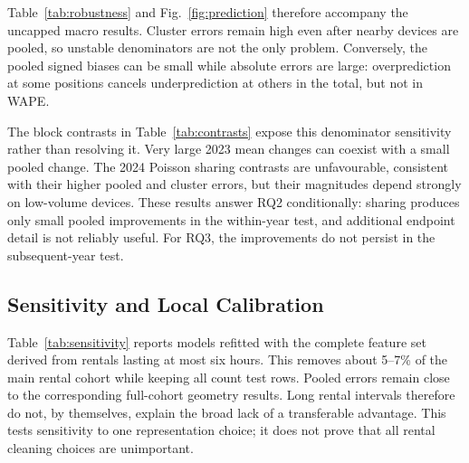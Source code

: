 \documentclass{interact}
\begin{document}
Table~\ref{tab:robustness} and Fig.~\ref{fig:prediction} therefore accompany the uncapped macro results. Cluster errors remain high even after nearby devices are pooled, so unstable denominators are not the only problem. Conversely, the pooled signed biases can be small while absolute errors are large: overprediction at some positions cancels underprediction at others in the total, but not in WAPE.

\begin{table}[t]
\caption{Paired sharing-minus-no-sharing differences in mean device WAPE, in percentage points. Negative values favour sharing. Percentile intervals resample spatial blocks. Extreme intervals reflect near-zero detector totals; they should not be read as precise citywide effect estimates.}
\label{tab:contrasts}\centering\footnotesize

\end{table}

The block contrasts in Table~\ref{tab:contrasts} expose this denominator sensitivity rather than resolving it. Very large 2023 mean changes can coexist with a small pooled change. The 2024 Poisson sharing contrasts are unfavourable, consistent with their higher pooled and cluster errors, but their magnitudes depend strongly on low-volume devices. These results answer RQ2 conditionally: sharing produces only small pooled improvements in the within-year test, and additional endpoint detail is not reliably useful. For RQ3, the improvements do not persist in the subsequent-year test.

\subsection{Sensitivity and Local Calibration}
Table~\ref{tab:sensitivity} reports models refitted with the complete feature set derived from rentals lasting at most six hours. This removes about 5--7\%{} of the main rental cohort while keeping all count test rows. Pooled errors remain close to the corresponding full-cohort geometry results. Long rental intervals therefore do not, by themselves, explain the broad lack of a transferable advantage. This tests sensitivity to one representation choice; it does not prove that all rental cleaning choices are unimportant.

\begin{table}[t]
\caption{Full-feature models using only rentals of at most six hours. WAPE in percent. Count samples and spatial splits are unchanged; the contextual baseline is the same as in the primary comparison.}
\label{tab:sensitivity}\centering\footnotesize

\end{table}
\end{document}

